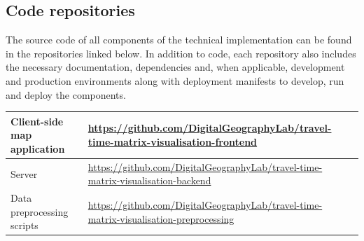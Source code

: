 \begin{appendices}
\subsection{Code repositories}
\label{appendix:code repositories}

The source code of all components of the technical implementation
can be found in the repositories linked below.
In addition to code, each repository also includes
the necessary documentation,
dependencies and, when applicable,
development and production environments along with deployment manifests
to develop, run and deploy the components.

\begin{table}[H]
	\centering
	\begin{tabular}{ | L{0.38\textwidth} | L{0.62\textwidth} | }
		\hline
		Client-side map application
		& \url{https://github.com/DigitalGeographyLab/travel-time-matrix-visualisation-frontend}
		\\
		\hline
		Server
		& \url{https://github.com/DigitalGeographyLab/travel-time-matrix-visualisation-backend}
		\\
		\hline
		Data preprocessing scripts
		& \url{https://github.com/DigitalGeographyLab/travel-time-matrix-visualisation-preprocessing}
		\\
		\hline
	\end{tabular}
\end{table}

\end{appendices}
